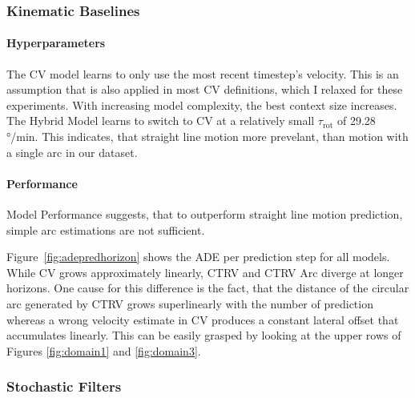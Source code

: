                 \subsubsection{Kinematic Baselines}
                    \paragraph{Hyperparameters}
                            The \ac{CV} model learns to only use the most recent timestep's velocity. This is an assumption that is also applied in most \ac{CV} definitions, which I relaxed for these experiments. With increasing model complexity, the best context size increases. The Hybrid Model learns to switch to \ac{CV} at a relatively small $\tau_\text{rot}$  of 29.28 °/min. This indicates, that straight line motion more prevelant, than motion with a single arc in our dataset.
            
                    \paragraph{Performance}
                        Model Performance suggests, that to outperform straight line motion prediction, simple arc estimations are not sufficient.
                        
              Figure~\ref{fig:adepredhorizon} shows the ADE per prediction step
                      for all models. While \ac{CV} grows approximately linearly, CTRV and
                      CTRV Arc diverge at longer horizons. One cause for this difference is the fact, that the distance of the circular arc generated by CTRV grows superlinearly with the number of prediction whereas a wrong velocity estimate in \ac{CV}
                        produces a constant lateral offset that accumulates linearly. This can be easily grasped by looking at the upper rows of Figures \ref{fig:domain1} and \ref{fig:domain3}. %
                        
                \subsubsection{Stochastic Filters}
